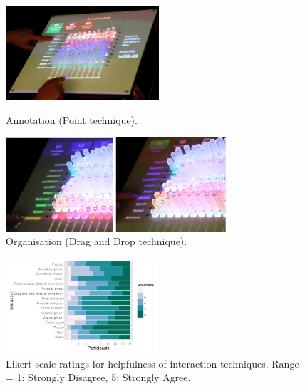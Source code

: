 \documentclass[11pt]{article}
\begin{document}
\begin{figure}[H]
\centering
  \includegraphics[height=3.5cm]{img/taher2015-annotation.png}
  \caption{Annotation (Point technique).}\label{fig:taher2015-annotation}
\endminipage\hfill
{}%
\centering
  \includegraphics[height=3.5cm]{img/taher2015-organize.png}
  \caption{Organisation (Drag and Drop technique).}\label{fig:taher2015-organize}
\endminipage
\end{figure}

\begin{figure}[H]
\centering
\includegraphics[width=0.5\textwidth]{img/taher2015-likert.png} 
\caption{Likert scale ratings for helpfulness of interaction
techniques. Range = 1: Strongly Disagree, 5: Strongly Agree.}\label{fig:taher2015-likert}
\end{figure}




\newpage
\small

\normalsize
\end{document}
